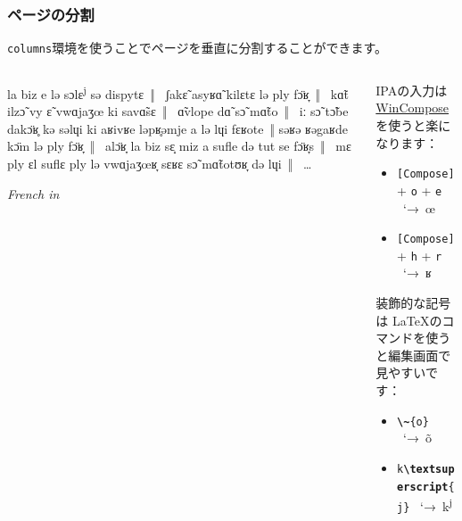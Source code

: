 \documentclass[%
  hyperref={%
    colorlinks,
    linkcolor=sDarkBlue,
    urlcolor=sDarkBlue,
    citecolor=sDarkBlue
  },
  aspectratio=169
]{beamer}
\newenvironment{quoteblock}{%
  \def\FrameCommand{%
    {\color{sLightGray}{\vrule width 3pt}}%
      \hspace{10pt}
  }%
  \MakeFramed {\advance\hsize-\width \FrameRestore}}%
{\endMakeFramed}
\begin{document}
    \begin{frame}[fragile]
        \frametitle{ページの分割}
        \texttt{columns}環境を使うことでページを垂直に分割することができます。

        \smallskip

        \begin{columns}[onlytextwidth]

            \begin{column}{0.48\textwidth}
                \begin{quoteblock}
                    la biz e lə sɔlɛ\textsuperscript{j} sə dispytɛ~‖
                    \ ʃak\~{ɛ} asyʁ\~{ɑ} kilɛtɛ lə ply f\"{ɔ}ʁ̞~‖
                    \ k\~{ɑ}t ilz\~{ɔ} vy \~{ɛ} vwɑjaʒœ ki sav\~{ɑ}sɛ~‖
                    \ \~{ɑ}vlope d\~{ɑ} s\~{ɔ} m\~{ɑ}to~‖
                    \ iː s\~{ɔ} t\~{ɔ}be dak\"{ɔ}ʁ̥ kə səlɥi ki aʁivʁe
                    ləpʁ̥əmje a lə lɥi fɛʁote~‖
                    səʁə ʁəgaʁde k\"{ɔ}m lə ply f\"{ɔ}ʁ̞~‖
\ al\"{ɔ}ʁ̞
la biz sɛ̝
miz a sufle də tut se f\"{ɔ}ʁ̞s~‖
                    \ mɛ ply ɛl suflɛ ply lə vwɑjaʒœʁ̞
                    sɛʁɛ s\~{ɔ} m\~{ɑ}totʊʁ̞
                    də lɥi~‖
                    \ …

                    \hfill \textit{French in }
                \end{quoteblock}

            \end{column}

            \begin{column}{0.48\textwidth}

                IPAの入力は\href{https://github.com/samhocevar/wincompose}{WinCompose}
                を使うと楽になります：
                \begin{itemize}
                    \item \texttt{[Compose]} + \texttt{o} + \texttt{e} \ \ltjjachar`→\ œ
                    \item \texttt{[Compose]} + \texttt{h} + \texttt{r} \ \ltjjachar`→\ ʁ
                \end{itemize}

                \bigskip

                装飾的な記号は \LaTeX のコマンドを使うと編集画面で見やすいです：

                \begin{itemize}
                    \item \texttt{\textcolor{sRed}{\bfseries \textbackslash\textasciitilde}\{o\}} \ \ltjjachar`→\ \~{o}
                    \item \texttt{k\textcolor{sRed}{\bfseries \textbackslash textsuperscript}\{j\}} \ \ltjjachar`→\ k\textsuperscript{j}
                \end{itemize}

            \end{column}

        \end{columns}
    \end{frame}
\end{document}
